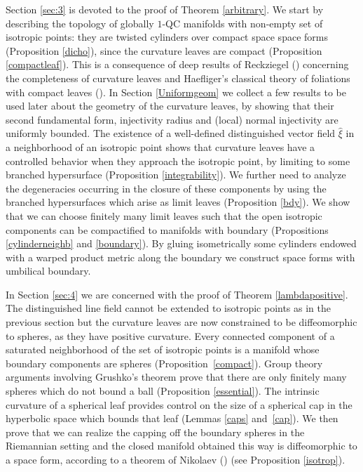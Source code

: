 \documentclass[JEP,XML,SOM,Unicode]{cedram}
\theoremstyle{definition}
\theoremstyle{remark}
\numberwithin{equation}{section}
\begin{document}
Section \ref{sec:3} is devoted to the proof of Theorem \ref{arbitrary}.
We start by describing the topology of globally $1$-QC manifolds with non-empty set of isotropic points:
they are twisted cylinders over compact space space forms (Proposition \ref{dicho}), since the curvature leaves
are compact (Proposition \ref{compactleaf}). This is a consequence of deep results of Reckziegel (\cite{Re2,Re}) concerning the completeness
of curvature leaves and Haefliger's classical theory of foliations with compact leaves (\cite{Hae}).
In Section \ref{Uniformgeom} we collect a few results to be used later about the geometry of the curvature leaves,
by showing that their second fundamental form, injectivity radius and (local) normal injectivity are uniformly bounded.
The existence of a well-defined distinguished vector field $\widehat{\xi}$ in a neighborhood of an isotropic point shows that
curvature leaves have a controlled behavior when they approach the isotropic point, by limiting to some branched
hypersurface (Proposition \ref{integrability}).
We further need to analyze the degeneracies occurring in the closure of these components by using the
branched hypersurfaces which arise as limit leaves (Proposition \ref{bdy}). We show that we can choose finitely many limit leaves
such that the open isotropic components can be compactified to manifolds with boundary (Propositions
\ref{cylinderneighb} and \ref{boundary}). By gluing isometrically some
cylinders endowed with a warped product metric along the boundary we construct space forms with umbilical boundary.

In Section \ref{sec:4} we are concerned with the proof of Theorem \ref{lambdapositive}. The distinguished line field
cannot be extended to isotropic points as in the previous section but the curvature leaves are now constrained to be
diffeomorphic to spheres, as they have positive curvature.
Every connected component of a saturated neighborhood of the set of isotropic points is a manifold whose boundary
components are spheres (\hbox{Proposition}~\ref{compact}).
Group theory arguments involving Grushko's theorem prove that there are only finitely many
spheres which do not bound a ball (Proposition \ref{essential}). The intrinsic curvature of a spherical leaf provides control on the
size of a spherical cap in the hyperbolic space which bounds that leaf (Lemmas \ref{caps} and~\ref{cap}). We then prove that
we can realize the capping off the boundary spheres in the Riemannian setting and the closed manifold obtained
this way is diffeomorphic to a space form, according to a theorem of Nikolaev (\cite{Nik}) (see Proposition \ref{isotrop}).
\end{document}
